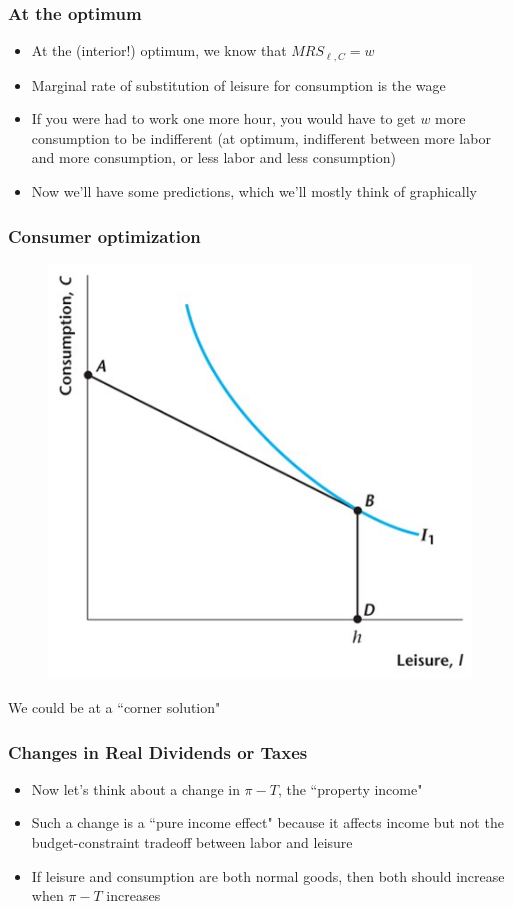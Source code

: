 \documentclass{beamer}
\begin{document}
\begin{frame}
\frametitle[alignment=center]{At the optimum}
\begin{itemize}
\item At the (interior!) optimum, we know that $MRS_{\ell,C}=w$
\bigskip
\item Marginal rate of substitution of leisure for consumption is the wage
\bigskip
\item If you were had to work one more hour, you would have to get $w$ more consumption to be indifferent (at optimum, indifferent between more labor and more consumption, or less labor and less consumption)
\bigskip
\item Now we'll have some predictions, which we'll mostly think of graphically
\end{itemize}
\end{frame}

\begin{frame}
\frametitle[alignment=center]{Consumer optimization}
\begin{figure}
\centering
\includegraphics[scale=0.5]{Figures/W_Fig_4pt6.png}
\end{figure}
We could be at a ``corner solution"
\end{frame}


\begin{frame}
\frametitle[alignment=center]{Changes in Real Dividends or Taxes}
\begin{itemize}
\item Now let's think about a change in $\pi-T$, the ``property income"
\bigskip
\item Such a change is a ``pure income effect" because it affects income but not the budget-constraint tradeoff between labor and leisure
\bigskip
\item If leisure and consumption are both normal goods, then both should increase when $\pi-T$ increases
\end{itemize}
\end{frame}
\end{document}
